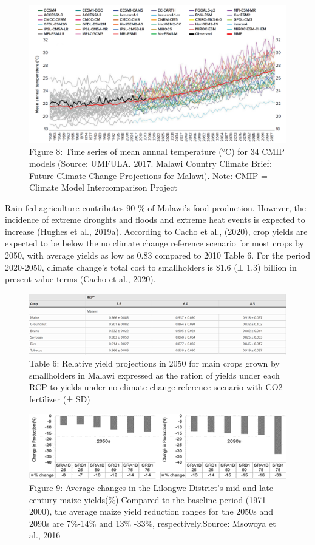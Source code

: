 \documentclass[
]{book}
\begin{document}
\begin{figure}
\centering
\includegraphics{images/tavg_cmip_all.png}
\caption{Figure 8: Time series of mean annual temperature (°C) for 34 CMIP models (Source: UMFULA. 2017. Malawi Country Climate Brief: Future Climate Change Projections for Malawi). Note: CMIP = Climate Model Intercomparison Project}
\end{figure}

Rain-fed agriculture contributes 90 \% of Malawi's food production. However, the incidence of extreme droughts and floods and extreme heat events is expected to increase (Hughes et al., 2019a). According to Cacho et al., (2020), crop yields are expected to be below the no climate change reference scenario for most crops by 2050, with average yields as low as 0.83 compared to 2010 Table 6. For the period 2020-2050, climate change's total cost to smallholders is \$1.6 (± 1.3) billion in present-value terms (Cacho et al., 2020).

\begin{figure}
\centering
\includegraphics{images/yield_proj_maincrops.png}
\caption{Table 6: Relative yield projections in 2050 for main crops grown by smallholders in Malawi expressed as the ration of yields under each RCP to yields under no climate change reference scenario with CO2 fertilizer (± SD)}
\end{figure}

\begin{figure}
\centering
\includegraphics{images/maize_yields_lilongwe.png}
\caption{Figure 9: Average changes in the Lilongwe District's mid-and late century maize yields(\%).Compared to the baseline period (1971-2000), the average maize yield reduction ranges for the 2050s and 2090s are 7\%-14\% and 13\% -33\%, respectively.Source: Msowoya et al., 2016}
\end{figure}
\end{document}

